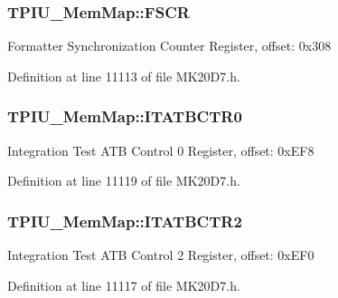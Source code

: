 \subsubsection[{\texorpdfstring{F\+S\+CR}{FSCR}}]{ T\+P\+I\+U\+\_\+\+Mem\+Map\+::\+F\+S\+CR}\hypertarget{struct_t_p_i_u___mem_map_a86904c5ac326d4cca551c4fb45a9f9ba}{}\label{struct_t_p_i_u___mem_map_a86904c5ac326d4cca551c4fb45a9f9ba}
Formatter Synchronization Counter Register, offset\+: 0x308 

Definition at line 11113 of file M\+K20\+D7.\+h.

\subsubsection[{\texorpdfstring{I\+T\+A\+T\+B\+C\+T\+R0}{ITATBCTR0}}]{ T\+P\+I\+U\+\_\+\+Mem\+Map\+::\+I\+T\+A\+T\+B\+C\+T\+R0}\hypertarget{struct_t_p_i_u___mem_map_a1b09ee3aba38ca90fb73747e55d0f775}{}\label{struct_t_p_i_u___mem_map_a1b09ee3aba38ca90fb73747e55d0f775}
Integration Test A\+TB Control 0 Register, offset\+: 0x\+E\+F8 

Definition at line 11119 of file M\+K20\+D7.\+h.

\subsubsection[{\texorpdfstring{I\+T\+A\+T\+B\+C\+T\+R2}{ITATBCTR2}}]{ T\+P\+I\+U\+\_\+\+Mem\+Map\+::\+I\+T\+A\+T\+B\+C\+T\+R2}\hypertarget{struct_t_p_i_u___mem_map_a1f6d13a29acd05c39533ebb6616cc67a}{}\label{struct_t_p_i_u___mem_map_a1f6d13a29acd05c39533ebb6616cc67a}
Integration Test A\+TB Control 2 Register, offset\+: 0x\+E\+F0 

Definition at line 11117 of file M\+K20\+D7.\+h.

